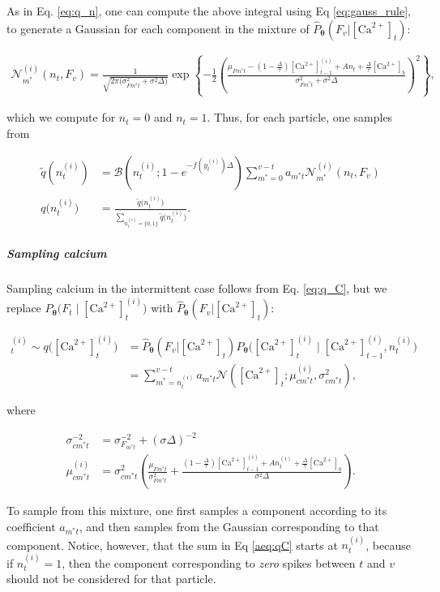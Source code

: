 \documentclass[12pt]{article}
\providecommand{\ve}[1]{\boldsymbol{#1}}
\providecommand{\ve}[1]{\boldsymbol{#1}}
\newcommand{\thetn}{\ve{\theta}}
\newcommand{\p}{P_{\thetn}}
\newcommand{\phat}{\widehat{P}_{\thetn}(F_v | \Ca_t)}
\newcommand{\m}{m^{\ast}}
\newcommand{\Ca}{[\text{Ca}^{2+}]}
\begin{document}
\noindent As in Eq. \ref{eq:q_n}, one can compute the above integral using Eq \ref{eq:gauss_rule}, to generate a Gaussian for each component in the mixture of $\phat$:

\begin{align} \label{aeq:Z_t}
\mathcal{N}_{\m}^{(i)}(n_t, F_v) =
\frac{1}{\sqrt{2 \pi \big(\sigma_{F\m t}^2 + \sigma^2 \Delta\big)}} \exp \left\{-\frac{1}{2}\left(\frac{\mu_{F\m t}- (1- \frac{\Delta}{\tau}) \Ca_{t-1}^{(i)} + A n_t + \frac{\Delta}{\tau} \Ca_b}{ \sigma_{F\m t}^2 + \sigma^2 \Delta}\right)^2\right\},
\end{align}

\noindent which we compute for $n_t=0$ and $n_t=1$.  Thus, for each particle, one samples from

\begin{subequations} \label{aeq:qn}
\begin{align}
\widetilde{q}(n_t^{(i)})&=\mathcal{B}(n_t^{(i)}; 1-e^{-f(y_t^{(i)}) \Delta}) \sum_{\m=0}^{v-t} a_{\m t} \mathcal{N}_{\m}^{(i)}(n_t, F_v)\\
q\big(n_t^{(i)}\big)&=\frac{\widetilde{q}\big(n_t^{(i)}\big)}{\sum_{n_t^{(i)}=\{0,1\}} \widetilde{q}\big(n_t^{(i)}\big)}.
\end{align}
\end{subequations}

\subparagraph{Sampling calcium}

Sampling calcium in the intermittent case follows from Eq. \ref{eq:q_C}, but we replace $\p\big(F_t \mid \Ca_t^{(i)}\big)$ with $\phat$: 

\begin{align}
\Ca_t^{(i)} \sim q\big(\Ca_t^{(i)}\big) &=\phat \p\big(\Ca_t^{(i)} \mid \Ca_{t-1}^{(i)}, n_t^{(i)}) \nonumber
\\ &=\sum_{\m=n_t^{(i)}}^{v-t} a_{\m t} \mathcal{N}\left(\Ca_t; \mu_{c\m t}^{(i)}, \sigma^2_{c\m t} \right), \label{aeq:qC}
\end{align}

\noindent where

\begin{align}
\sigma^{-2}_{c\m t} &= \sigma_{F_{\m t}}^{-2} + (\sigma \Delta)^{-2}\\
\mu^{(i)}_{c\m t} &=\sigma^2_{c\m t} \left( \frac{\mu_{F\m t}} {\sigma_{F\m t}^2} + \frac{(1-\frac{\Delta}{\tau}) \Ca_{t-1}^{(i)} + A n_t^{(i)} + \frac{\Delta}{\tau} \Ca_b}{\sigma^2 \Delta}\right).
\end{align}

To sample from this mixture, one first samples a component according to its coefficient $a_{\m t}$, and then samples from the Gaussian corresponding to that component.  Notice, however, that the sum in Eq \ref{aeq:qC} starts at $n_t^{(i)}$, because if $n_t^{(i)}=1$, then the component corresponding to \emph{zero} spikes between $t$ and $v$ should not be considered for that particle.
\end{document}
